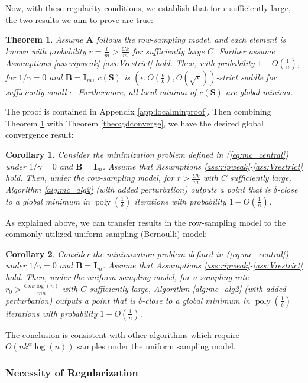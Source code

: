 \documentclass[twoside,11pt]{article}
\newtheorem{cor}{Corollary}
\newtheorem{theo}{Theorem}
\DeclareMathOperator\poly{poly}
\begin{document}
Now, with these regularity conditions, we establish that for $r$ sufficiently large, the two results we aim to prove are true:
\begin{theo}
\label{theo:localmin}
 Assume $\bm{A}$ follows the row-sampling model, and each element is known with probability $r=\frac{l}{m}>\frac{Ck}{m}$ for sufficiently large $C$. Further assume Assumptions \ref{ass:ripweak}-\ref{ass:Vrestrict} hold. Then, with probability $1-O(\frac{1}{n})$, for $1/\gamma=0$ and $\bm{B}=\bm{I}_m$, $c(\bm{S})$ is $(\epsilon, O(\frac{\epsilon}{k}),O(\sqrt{\epsilon}))$-strict saddle for sufficiently small $\epsilon$. Furthermore, all local minima of $c(\bm{S})$ are global minima. 
\end{theo}
The proof is contained in Appendix \ref{app:localminproof}. Then combining Theorem \ref{theo:localmin} with Theorem \ref{theo:gdconverge}, we have the desired global convergence result:
\begin{cor}
Consider the minimization problem defined in (\ref{eq:mc_central}) under $1/\gamma=0$ and $\bm{B}=\bm{I}_m$. Assume that Assumptions \ref{ass:ripweak}-\ref{ass:Vrestrict} hold. Then, under the row-sampling model, for $r>\frac{Ck}{m}$ with $C$ sufficiently large, Algorithm \ref{alg:mc_alg2} (with added perturbation) outputs a point that is $\delta$-close to a global minimum in $\poly(\frac{1}{\delta})$ iterations with probability $1-O(\frac{1}{n})$. 
\end{cor}
As explained above, we can transfer results in the row-sampling model to the commonly utilized uniform sampling (Bernoulli) model:
\begin{cor}
Consider the minimization problem defined in (\ref{eq:mc_central}) under $1/\gamma=0$ and $\bm{B}=\bm{I}_m$. Assume that Assumptions \ref{ass:ripweak}-\ref{ass:Vrestrict} hold. Then, under the uniform sampling model, for a sampling rate $r_0 >\frac{Cnk\log(n)}{mn}$ with $C$ sufficiently large, Algorithm \ref{alg:mc_alg2} (with added perturbation) outputs a point that is $\delta$-close to a global minimum in $\poly( \frac{1}{\delta})$ iterations with probability $1-O(\frac{1}{n})$. 
\end{cor}
The conclusion is consistent with other algorithms which require $O(nk^\alpha \log(n))$ samples under the uniform sampling model. 
\subsubsection{Necessity of Regularization}
\label{subsubsec:regularization}
\end{document}
